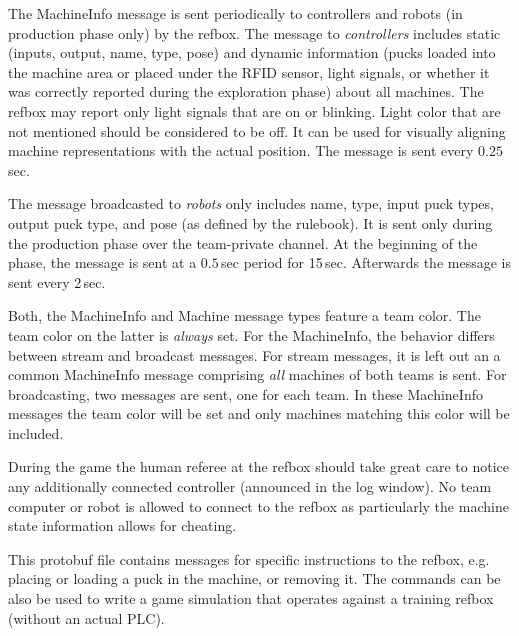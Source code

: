 \documentclass[a4paper]{article}
\begin{document}
%
{%
  The MachineInfo message is sent periodically to controllers and
  robots (in production phase only) by the refbox. The message to
  \emph{controllers} includes static (inputs, output, name, type,
  pose) and dynamic information (pucks loaded into the machine area or
  placed under the RFID sensor, light signals, or whether it was
  correctly reported during the exploration phase) about all machines.
  The refbox may report only light signals that are on or
  blinking. Light color that are not mentioned should be considered to
  be off. It can be used for visually aligning machine representations
  with the actual position. The message is sent every $0.25$\,sec.

  The message broadcasted to \emph{robots} only includes name, type,
  input puck types, output puck type, and pose (as defined by the
  rulebook). It is sent only during the production phase over the
  team-private channel. At the beginning of the phase, the message is
  sent at a $0.5$\,sec period for 15\,sec. Afterwards the message is
  sent every 2\,sec.
 
  \medskip
  Both, the MachineInfo and Machine message types feature a team
  color. The team color on the latter is \emph{always} set. For the
  MachineInfo, the behavior differs between stream and broadcast
  messages. For stream messages, it is left out an a common
  MachineInfo message comprising \emph{all} machines of both teams is
  sent. For broadcasting, two messages are sent, one for each team. In
  these MachineInfo messages the team color will be set and only
  machines matching this color will be included.

  \medskip

  During the game the human referee at the refbox should take great
  care to notice any additionally connected controller (announced in
  the log window). No team computer or robot is allowed to connect to
  the refbox as particularly the machine state information allows for
  cheating.
}

%
{%
  This protobuf file contains messages for specific instructions to
  the refbox, e.g. placing or loading a puck in the machine, or
  removing it. The commands can be also be used to write a game
  simulation that operates against a training refbox (without an
  actual PLC).
}
\end{document}
